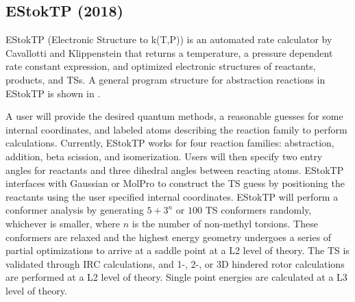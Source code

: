 \documentclass[preprint, 11pt]{elsarticle} %
\begin{document}


\subsection{EStokTP (2018)}


EStokTP (Electronic Structure to k(T,P)) \cite{Cavallotti:2019jctc} is an automated rate calculator by Cavallotti and Klippenstein that returns a temperature, a pressure dependent rate constant expression, and optimized electronic structures of reactants, products, and TSs.
A general program structure for abstraction reactions in EStokTP is shown in .

A user will provide the desired quantum methods, a reasonable guesses for some internal coordinates, and labeled atoms describing the reaction family to perform calculations.
Currently, EStokTP works for four reaction families: abstraction, addition, beta scission, and isomerization. 
Users will then specify two entry angles for reactants and three dihedral angles between reacting atoms.
EStokTP interfaces with Gaussian \cite{Gaussian:2009} or MolPro \cite{molpro:2012} to construct the TS guess by positioning the reactants using the user specified internal coordinates. 
EStokTP will perform a conformer analysis by generating $5 + 3^n$ or $100$ TS conformers randomly, whichever is smaller, where $n$ is the number of non-methyl torsions. 
These conformers are relaxed and the highest energy geometry undergoes a series of partial optimizations to arrive at a saddle point at a L2 level of theory. 
The TS is validated through IRC calculations, and 1-, 2-, or 3D hindered rotor calculations are performed at a L2 level of theory.
Single point energies are calculated at a L3 level of theory.
\end{document}
